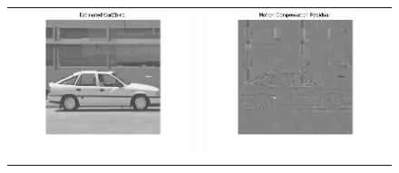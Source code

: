 \documentclass[article,oneside]{memoir}
\begin{document}
 \begin{center}
  \begin{figure}[ht]
  \begin{tabular}{@{} cc @{}}

  \begin{minipage}{0.5\hsize}
   \begin{center}
   \includegraphics[width=10cm]{../images/estimatedcar23step.png}
   \end{center}
  \end{minipage}    &
  \begin{minipage}{0.5\hsize}
   \begin{center}
   \includegraphics[width=10cm]{../images/mcresidual3step.png}
   \end{center}
  \end{minipage}  
  \end{tabular}
 \end{figure} 
\end{center}
\end{document}
